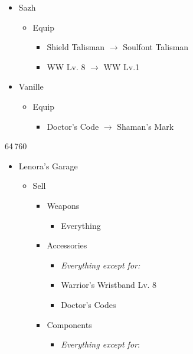 \begin{multicols}{2}
\begin{menu}
\begin{itemize}
\begin{itemize}
    \end{itemize}
    \equip
    \begin{itemize}
        \item Sazh
        \begin{itemize}
            \item Equip
            \begin{itemize}
                \item Shield Talisman $\rightarrow$ Soulfont Talisman
		\item WW Lv. 8 $\rightarrow$ WW Lv.1
            \end{itemize}
        \end{itemize}
	\item Vanille
        \begin{itemize}
            \item Equip
            \begin{itemize}
                \item Doctor's Code $\rightarrow$ Shaman's Mark
            \end{itemize}
        \end{itemize}
    \end{itemize}
\end{itemize}
\end{menu}
\begin{shop}{64\,760}
\begin{itemize}
    \item Lenora's Garage
    \begin{itemize}
        \item Sell
        \begin{itemize}
            \item Weapons
            \begin{itemize}
                \item Everything
            \end{itemize}
            \item Accessories
            \begin{itemize}
            \item \textit{Everything except for:}
                \item Warrior's Wristband Lv. 8
                \item Doctor's Codes
            \end{itemize}
            \item Components
            \begin{itemize}
                \item \textit{Everything except for}:

\end{itemize}
\end{itemize}
\end{itemize}
\end{itemize}
\end{shop}
\end{multicols}
